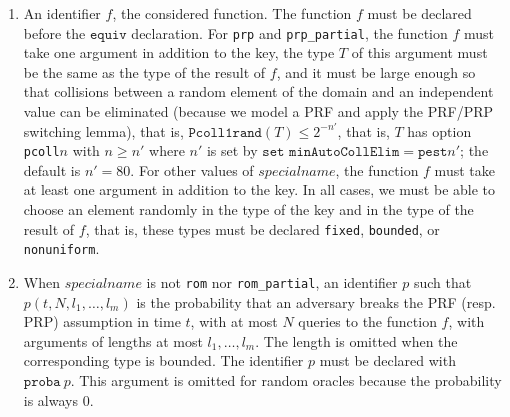 \begin{itemize}
\begin{enumerate}
\item An identifier $f$, the considered function. The function $f$
must be declared before the $\texttt{equiv}$
declaration. For \texttt{prp} and \texttt{prp\_partial}, the function
$f$ must take one argument in addition to the key, the type $T$ of
this argument must be the same as the type of the result of $f$, and
it must be large enough so that collisions between a random element of
the domain and an independent value can be eliminated (because we
model a PRF and apply the PRF/PRP switching lemma), that is,
$\texttt{Pcoll1rand}(T) \leq 2^{-n'}$, that is, $T$ has
option \texttt{pcoll$n$} with $n \geq n'$ where $n'$ is set by
$\texttt{set minAutoCollElim} = \texttt{pest}n'$; the default is $n' =
80$.  For other values of $\mathit{specialname}$, the function $f$
must take at least one argument in addition to the key.  In all cases,
we must be able to choose an element randomly in the type of the key
and in the type of the result of $f$, that is, these types must be
declared \texttt{fixed}, \texttt{bounded}, or \texttt{nonuniform}.

\item When $\mathit{specialname}$ is not \texttt{rom} nor
  \texttt{rom\_partial}, an identifier $\mathit{p}$ such that
  $\mathit{p}(t, N, l_1, \dots, l_m)$ is the probability that an
  adversary breaks the PRF (resp. PRP) assumption in time $t$, with at
  most $N$ queries to the function $f$, with arguments of lengths at
  most $l_1, \dots, l_m$. The length is omitted when the corresponding
  type is bounded. The identifier $\mathit{p}$ must be declared with
  $\texttt{proba}\ p$. This argument is omitted for random oracles
  because the probability is always 0.


\end{enumerate}
\end{itemize}
